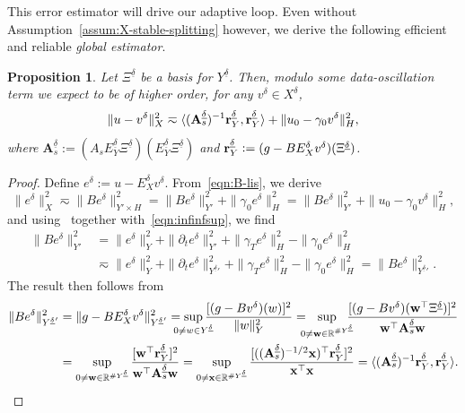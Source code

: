 \documentclass[11pt,a4paper,oneside,english]{amsart}
\numberwithin{equation}{section}
\numberwithin{theorem}{section}
\newtheorem{prop}[theorem]{Proposition}
\theoremstyle{definition}
\newcommand{\R}{\mathbb{R}}
\newcommand{\la}{\langle}
\newcommand{\ra}{\rangle}
\newcommand{\udelta}{{\underline{\delta}}}
\newcommand{\jw}[1]{{\color{red}{JW: #1}}}
\begin{document}
This error estimator will drive our adaptive loop. Even without Assumption~\ref{assum:X-stable-splitting} however, we derive the following efficient and reliable \emph{global estimator}.
\begin{prop}
  \label{prop:global-apost}
  Let $\Xi^{\udelta}$ be a basis for $Y^{\udelta}$. Then, modulo some data-oscillation
  term we expect to be of higher order, for any $v^\delta \in X^\delta$,
  \[
    \|u - v^\delta\|_X^2 \eqsim \la (\mathbf A_s^{\udelta})^{-1}{\bf r}^\udelta_Y, {\bf r}^\udelta_Y \ra + \|u_0 - \gamma_0 v^\delta\|_H^2,
  \]
  where $\mathbf A_s^{\udelta} := (A_s E_Y^{\udelta} \Xi^{\udelta})(E_Y^{\udelta} \Xi^{\udelta})$ and ${\bf r}^\udelta_Y := (g - B E_X^{\delta} v^\delta)(\Xi^\udelta)$.
  \jw{zouden we in staat zijn om de constantes hidden in $\eqsim$ hierboven, precies te maken? Mss de data oscillation erin?}
\end{prop}
\begin{proof}
  Define $e^\delta := u - E_X^\delta v^\delta$. From~\eqref{eqn:B-lis}, we derive
  \[
    \|e^\delta\|_X^2 \eqsim \|B e^\delta\|_{Y' \times H}^2
    = \|B e^\delta\|_{Y'}^2 + \|\gamma_0 e^\delta\|_H^2 = \|B e^\delta\|_{Y'}^2 + \|u_0 - \gamma_0 v^\delta\|_H^2,
  \]
  and using~\cite[Lemma 3.4]{Stevenson2020a} together with~\eqref{eqn:infinfsup}, we find
  \begin{align*}
    \|B e^\delta\|_{Y'}^2 &= \|e^\delta\|_Y^2 + \|\partial_t e^\delta\|_{Y'}^2 + \|\gamma_T e^\delta\|_H^2 - \|\gamma_0 e^\delta\|_H^2 \\
    &\eqsim \|e^\delta\|_Y^2 + \|\partial_t e^\delta\|_{{Y^\udelta}'}^2 + \|\gamma_T e^\delta\|_H^2 - \|\gamma_0 e^\delta\|_H^2 = \|B e^\delta\|_{{Y^\udelta}'}^2.
  \end{align*}
  The result then follows from
  \begin{align*}
    \|B e^\delta\|_{{Y^\udelta}'}^2 &= \|g - BE_X^\delta v^\delta\|_{{Y^\udelta}'}^2
    = \sup_{\mathclap{0 \not= w \in Y^\udelta}} \frac{[(g - Bv^\delta)(w)]^2}{\|w\|_Y^2} = ~~\sup_{\mathclap{0 \not= {\bf w} \in \R^{\# Y^\udelta}}} ~~\frac{[(g - Bv^\delta)({\bf w}^\top \Xi^\udelta)]^2}{{\bf w}^\top {\bf A}_s^\udelta {\bf w}} \\
    &= \sup_{0 \not= {\bf w} \in \R^{\# Y^\udelta}} \frac{[{\bf w}^\top {\bf r}^\udelta_Y]^2}{{\bf w}^\top {\bf A}_s^\udelta {\bf w}} = \sup_{0 \not= {\bf x} \in \R^{\# Y^\udelta}} \frac{[(({\bf A}_s^\udelta)^{-1/2}{\bf x})^\top {\bf r}^\udelta_Y]^2}{{\bf x}^\top {\bf x}} = \la ({\bf A}_s^\udelta)^{-1} {\bf r}_Y^\udelta, {\bf r}_Y^\udelta \ra. \qedhere
  \end{align*}
\end{proof}
\end{document}
